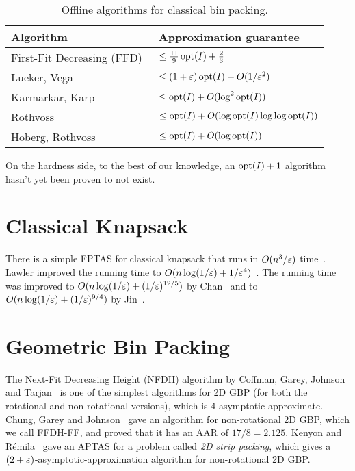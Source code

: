 \begin{table}[ht]
\centering
\caption{Offline algorithms for classical bin packing.}
\begin{tabular}{ll}
\toprule Algorithm & Approximation guarantee
\\ \midrule First-Fit Decreasing (FFD)~\cite{dosa2007tight}
    & $\le \frac{11}{9}\operatorname{opt}(I) + \frac{2}{3}$
\\[\defaultaddspace] Lueker, Vega~\cite{bp-aptas}
    & $\le (1+\varepsilon)\operatorname{opt}(I) + O(1/\varepsilon^2)$
\\[\defaultaddspace] Karmarkar, Karp~\cite{karmarkar-karp}
    & $\le \operatorname{opt}(I) + O(\log^2\operatorname{opt}(I))$
\\[\defaultaddspace] Rothvoss~\cite{rothvoss2013}
    & $\le \operatorname{opt}(I) + O(\log\operatorname{opt}(I)\log\log\operatorname{opt}(I))$
\\[\defaultaddspace] Hoberg, Rothvoss~\cite{HobergR17}
    & $\le \operatorname{opt}(I) + O(\log\operatorname{opt}(I))$
\\ \bottomrule
\end{tabular}
\label{table:offline-1bp}
\end{table}

On the hardness side, to the best of our knowledge,
an $\operatorname{opt}(I) + 1$ algorithm hasn't yet been proven to not exist.

\section{Classical Knapsack}

There is a simple FPTAS for classical knapsack that runs in
$O(n^3/\varepsilon)$ time~\cite{daa:rounding-dp}.
Lawler improved the running time to $O(n\log(1/\varepsilon) + 1/\varepsilon^4)$~\cite{lawler1979fast}.
The running time was improved to $O(n\log(1/\varepsilon) + (1/\varepsilon)^{12/5})$
by Chan~\cite{chan2018approximation}
and to $O(n\log(1/\varepsilon) + (1/\varepsilon)^{9/4})$ by Jin~\cite{jin2019improved}.

\section{Geometric Bin Packing}

The Next-Fit Decreasing Height (NFDH) algorithm by
Coffman, Garey, Johnson and Tarjan~\cite{coffman1980performance}
is one of the simplest algorithms for 2D GBP
(for both the rotational and non-rotational versions),
which is 4-asymptotic-approximate.
Chung, Garey and Johnson~\cite{chung1982packing}
gave an algorithm for non-rotational 2D GBP, which we call FFDH-FF,
and proved that it has an AAR of $17/8 = 2.125$.
Kenyon and R\'emila~\cite{kenyon1996strip} gave an APTAS for
a problem called \emph{2D strip packing}, which gives a
$(2+\varepsilon)$-asymptotic-approximation algorithm for non-rotational 2D GBP.


